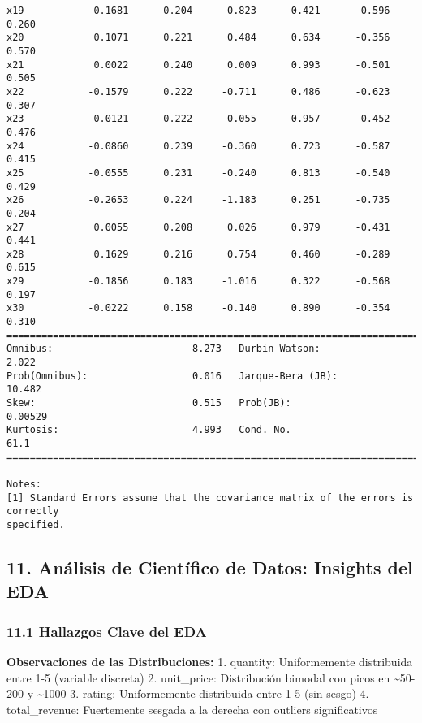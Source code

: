 \documentclass[11pt]{article}
\begin{document}
\begin{Verbatim}[commandchars=\\\{\}]
x19           -0.1681      0.204     -0.823      0.421      -0.596       0.260
x20            0.1071      0.221      0.484      0.634      -0.356       0.570
x21            0.0022      0.240      0.009      0.993      -0.501       0.505
x22           -0.1579      0.222     -0.711      0.486      -0.623       0.307
x23            0.0121      0.222      0.055      0.957      -0.452       0.476
x24           -0.0860      0.239     -0.360      0.723      -0.587       0.415
x25           -0.0555      0.231     -0.240      0.813      -0.540       0.429
x26           -0.2653      0.224     -1.183      0.251      -0.735       0.204
x27            0.0055      0.208      0.026      0.979      -0.431       0.441
x28            0.1629      0.216      0.754      0.460      -0.289       0.615
x29           -0.1856      0.183     -1.016      0.322      -0.568       0.197
x30           -0.0222      0.158     -0.140      0.890      -0.354       0.310
==============================================================================
Omnibus:                        8.273   Durbin-Watson:                   2.022
Prob(Omnibus):                  0.016   Jarque-Bera (JB):               10.482
Skew:                           0.515   Prob(JB):                      0.00529
Kurtosis:                       4.993   Cond. No.                         61.1
==============================================================================

Notes:
[1] Standard Errors assume that the covariance matrix of the errors is correctly
specified.
    \end{Verbatim}

    \subsection{11. Análisis de Científico de Datos: Insights del
EDA}\label{anuxe1lisis-de-cientuxedfico-de-datos-insights-del-eda}

    \subsubsection{11.1 Hallazgos Clave del
EDA}\label{hallazgos-clave-del-eda}

\textbf{Observaciones de las Distribuciones:} 1. quantity: Uniformemente
distribuida entre 1-5 (variable discreta) 2. unit\_price: Distribución
bimodal con picos en \textasciitilde50-200 y \textasciitilde1000 3.
rating: Uniformemente distribuida entre 1-5 (sin sesgo) 4.
total\_revenue: Fuertemente sesgada a la derecha con outliers
significativos
\end{document}
